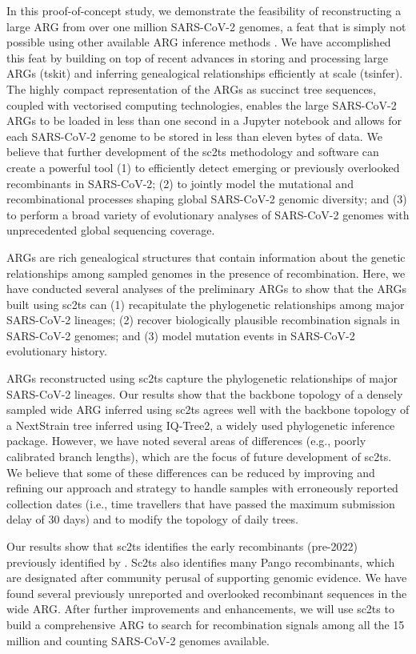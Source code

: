 \documentclass{article}
\begin{document}
In this proof-of-concept study, we demonstrate the feasibility of
reconstructing a large ARG from over one million SARS-CoV-2 genomes, a feat
that is simply not possible using other available ARG inference methods
\citep{Rasmussen2014-el,Ignatieva2021-rg, Speidel2019-yh}. We have accomplished
this feat by building on top of recent advances in storing and processing large
ARGs (tskit) and inferring genealogical relationships efficiently at scale
(tsinfer). The highly compact representation of the ARGs as succinct tree
sequences, coupled with vectorised computing technologies, enables the large
SARS-CoV-2 ARGs to be loaded in less than one second in a Jupyter notebook and
allows for each SARS-CoV-2 genome to be stored in less than eleven bytes of
data. We believe that further development of the sc2ts methodology and software
can create a powerful tool (1) to efficiently detect emerging or previously
overlooked recombinants in SARS-CoV-2; (2) to jointly model the mutational and
recombinational processes shaping global SARS-CoV-2 genomic diversity; and (3)
to perform a broad variety of evolutionary analyses of SARS-CoV-2 genomes with
unprecedented global sequencing coverage.

ARGs are rich genealogical structures that contain information about the
genetic relationships among sampled genomes in the presence of recombination.
Here, we have conducted several analyses of the preliminary ARGs to show that
the ARGs built using sc2ts can (1) recapitulate the phylogenetic relationships
among major SARS-CoV-2 lineages; (2) recover biologically plausible
recombination signals in SARS-CoV-2 genomes; and (3) model mutation events in
SARS-CoV-2 evolutionary history.

ARGs reconstructed using sc2ts capture the phylogenetic relationships of major
SARS-CoV-2 lineages. Our results show that the backbone topology of a densely
sampled wide ARG inferred using sc2ts agrees well with the backbone topology of
a NextStrain tree inferred using IQ-Tree2, a widely used phylogenetic inference
package. However, we have noted several areas of differences (e.g., poorly
calibrated branch lengths), which are the focus of future development of sc2ts.
We believe that some of these differences can be reduced by improving and
refining our approach and strategy to handle samples with erroneously reported
collection dates (i.e., time travellers that have passed the maximum submission
delay of 30 days) and to modify the topology of daily trees.

Our results show that sc2ts identifies the early recombinants (pre-2022)
previously identified by \cite{Jackson2021-ik}. Sc2ts also identifies many
Pango recombinants, which are designated after community perusal of supporting
genomic evidence. We have found several previously unreported and overlooked
recombinant sequences in the wide ARG. After further improvements and
enhancements, we will use sc2ts to build a comprehensive ARG to search for
recombination signals among all the 15 million and counting SARS-CoV-2 genomes
available.
\end{document}
